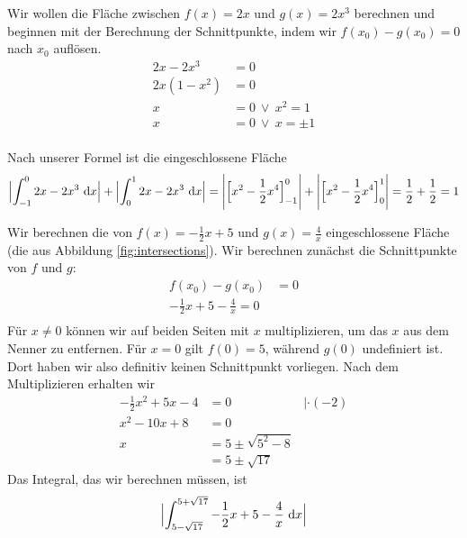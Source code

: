 \documentclass[../../main.tex]{subfiles}
\begin{document}
\begin{example}{}
Wir wollen die Fläche zwischen $f(x)=2x$ und $g(x)=2x^3$ berechnen und beginnen mit der Berechnung der Schnittpunkte, indem wir $f(x_0)-g(x_0)=0$ nach $x_0$ auflösen.
\begin{align*}
    2x-2x^3&=0\\
    2x(1-x^2)&=0\\
    x&=0~\lor~x^2=1\\
    x&=0~\lor~x=\pm1\\
\end{align*}

Nach unserer Formel ist die eingeschlossene Fläche \[\Bigl|\int_{-1}^0 2x-2x^3\mathop{}\mathrm{d} x\Bigr|+\Bigl|\int_0^1 2x-2x^3\mathop{}\mathrm{d} x\Bigr|=\Biggl|\Bigl[x^2-\frac{1}{2}x^4\Bigr]_{-1}^0\Biggr|+\Biggl|\Bigl[x^2-\frac{1}{2}x^4\Bigr]_0^1\Biggr|=\frac{1}{2}+\frac{1}{2}=1\]
\end{example}
\begin{example}{}
Wir berechnen die von $f(x)=-\frac{1}{2}x+5$ und $g(x)=\frac{4}{x}$ eingeschlossene Fläche (die aus Abbildung \ref{fig:intersections}). Wir berechnen zunächst die Schnittpunkte von $f$ und $g$:
\begin{align*}
    f(x_0)-g(x_0)&=0\\
    -\frac{1}{2}x+5-\frac{4}{x}=0\\
\end{align*}
Für $x\neq 0$ können wir auf beiden Seiten mit $x$ multiplizieren, um das $x$ aus dem Nenner zu entfernen. Für $x=0$ gilt $f(0)=5$, während $g(0)$ undefiniert ist. Dort haben wir also definitiv keinen Schnittpunkt vorliegen. Nach dem Multiplizieren erhalten wir
\begin{align*}
    -\frac{1}{2}x^2+5x-4&=0 & |\cdot(-2)\\
    x^2-10x+8&=0\\
    x&=5\pm\sqrt{5^2-8}\\
    &=5\pm\sqrt{17}
\end{align*}
Das Integral, das wir berechnen müssen, ist
\[\Bigl|\int_{5-\sqrt{17}}^{5+\sqrt{17}} -\frac{1}{2}x+5-\frac{4}{x}\mathop{}\mathrm{d} x\Bigr|\]
\end{example}
\end{document}
